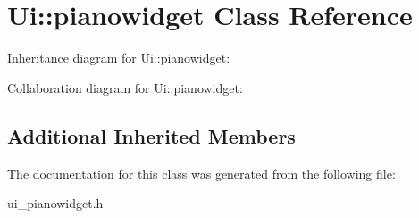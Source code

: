 \hypertarget{classUi_1_1pianowidget}{}\section{Ui\+:\+:pianowidget Class Reference}
\label{classUi_1_1pianowidget}


Inheritance diagram for Ui\+:\+:pianowidget\+:


Collaboration diagram for Ui\+:\+:pianowidget\+:
\subsection*{Additional Inherited Members}


The documentation for this class was generated from the following file\+:\begin{DoxyCompactItemize}
\item 
ui\+\_\+pianowidget.\+h\end{DoxyCompactItemize}
